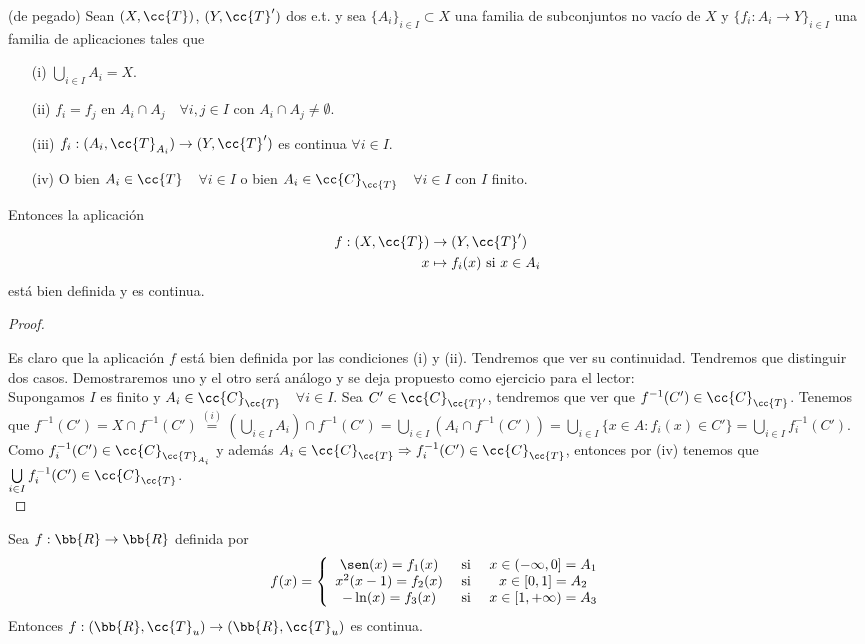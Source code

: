 \begin{lema} (de pegado) Sean $(X, \cc{T})$, $(Y, \cc{T}')$ dos e.t. y sea $\{A_i\}_{i\in I}\subset X$ una familia de subconjuntos no vacío de $X$ y $\{f_i:A_i \to Y\}_{i\in I}$ una familia de aplicaciones tales que 
    \begin{enumerate}
        \item[(i)] $\bigcup\limits_{i\in I} A_i =X$.
        \item[(ii)] $f_i=f_j$ en $A_i\cap A_j$\ \ $\forall i,j\in I$ con $A_i\cap A_j \neq \emptyset$. 
        \item[(iii)] $f_i:(A_i, \cc{T}_{A_i})\to (Y, \cc{T}')$ es continua $\forall i \in I$. 
        \item[(iv)] O bien $A_i\in \cc{T}$\ \ $\forall i \in I$ o bien $A_i \in \cc{C}_{\cc{T}}$\ \ $\forall i \in I$ con $I$ finito. 
    \end{enumerate}
    Entonces la aplicación 
    \begin{align*}
        f:(X, \cc{T})&\to (Y, \cc{T}')\\
        x &\mapsto f_i(x) \text{ si }x\in A_i
    \end{align*}
    está bien definida y es continua.
    \begin{proof}\

        Es claro que la aplicación $f$ está bien definida por las condiciones (i) y (ii). Tendremos que ver su continuidad. Tendremos que distinguir dos casos. Demostraremos uno y el otro será análogo y se deja propuesto como ejercicio para el lector:\\

        Supongamos $I$ es finito y $A_i\in \cc{C}_{\cc{T}}$\ \ $\forall i \in I$. Sea $C'\in \cc{C}_{\cc{T}'}$, tendremos que ver que $f^{-1}(C')\in \cc{C}_{\cc{T}}$. Tenemos que $f^{-1}(C') = X\cap f^{-1}(C')\overset{(i)}{=}\left(\bigcup\limits_{i\in I}A_i\right)\cap f^{-1}(C') = \bigcup\limits_{i\in I}(A_i\cap f^{-1}(C')) = \bigcup\limits_{i\in I}\{x\in A : f_i(x)\in C'\} = \bigcup\limits_{i\in I} f_i^{-1}(C')$. Como $f_i^{-1}(C')\in \cc{C}_{\cc{T}_{A_i}}$ y además $A_i\in \cc{C}_{\cc{T}}\Rightarrow f_i^{-1}(C')\in \cc{C}_{\cc{T}}$, entonces por (iv) tenemos que $\bigcup\limits_{i\in I} f_i^{-1}(C')\in \cc{C}_{\cc{T}}$.\\
    \end{proof}
\end{lema}

\begin{ejemplo}
    Sea $f:\bb{R} \to \bb{R}$ definida por
    \begin{gather*}
        f(x)=\left\{
        \begin{array}{ccc}
            \sen(x)=f_1(x) & \text{ si } & x \in (-\infty, 0] = A_1\\
            x^2(x-1)=f_2(x) & \text{ si } & x \in [0,1] = A_2\\
            -\ln(x) = f_3(x) & \text{ si } & x \in [1, +\infty) = A_3\\
        \end{array}
        \right.
    \end{gather*}
    Entonces $f:(\bb{R}, \cc{T}_u) \to (\bb{R}, \cc{T}_u)$ es continua.
    \endsquare
\end{ejemplo}

